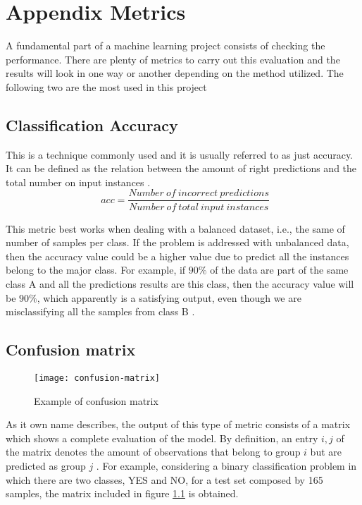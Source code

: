 

\chapter{Appendix Metrics}
\label{appendix:metrics}

	A fundamental part of a machine learning project consists of checking the performance. There are plenty of metrics to carry out this evaluation and the results will look in one way or another depending on the method utilized. The following two are the most used in this project
	
\section*{Classification Accuracy}

	This is a technique commonly used and it is usually referred to as just accuracy. It can be defined as the relation between the amount of right predictions and the total number on input instances \cite{Scikit-learn}.
	\[
	\ \ acc = \frac{Number\ of\ incorrect\  predictions}{Number\ of\ total\ input\ instances}
	\]
	
	This metric best works when dealing with a balanced dataset, i.e., the same of number of samples per class.
	If the problem is addressed with unbalanced data, then the accuracy value could be a higher value due to predict all the instances belong to the major class. For example, if $90\%$ of the data are part of the same class A and all the predictions results are this class, then the accuracy value will be $90\%$, which apparently is a satisfying output, even though we are misclassifying all the samples from class B \cite{Mishra2018}. 
	
\section*{Confusion matrix}

	\begin{figure}[b]
		\centering
		\captionsetup{justification=centering}
		\texttt{[image: confusion-matrix]}
		\caption{Example of confusion matrix}
		\label{fig:mesh6}
	\end{figure}

	As it own name describes, the output of this type of metric consists of a matrix which shows a complete evaluation of the model. By definition, an entry $i,j$ of the matrix denotes the amount of observations that belong to group $i$ but are predicted as group $j$ \cite{Scikit-learn}. For example, considering a binary classification problem in which there are two classes, YES and NO, for a test set composed by 165 samples, the matrix included in figure \ref{fig:mesh6} is obtained. 
	
